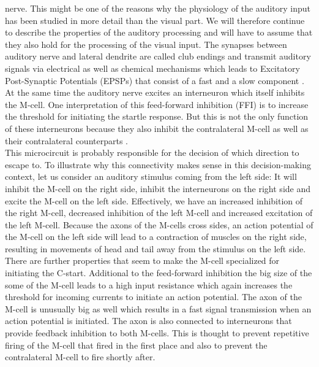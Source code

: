 \documentclass[a4paper,10pt,hidelinks]{scrreprt}
\begin{document}
	nerve.
	This might be one of the reasons why the physiology of the auditory input has been studied in 
	more detail than the visual part.
	We will therefore continue to describe the properties of the auditory processing and will have 
	to assume that they also hold for the processing of the visual input.
	The synapses between auditory nerve and lateral dendrite are called club endings and transmit 
	auditory signals via electrical as well as chemical mechanisms which leads to Excitatory 
	Post-Synaptic Potentials (EPSPs) that consist of a fast and a slow component \citep{Korn2005}.
	At the same time the auditory nerve excites an interneuron which itself inhibits the M-cell.
	One interpretation of this feed-forward inhibition (FFI) is to increase the threshold for 
	initiating the startle response.
	But this is not the only function of these interneurons because they also inhibit the 
	contralateral M-cell as well as their contralateral counterparts \citep{Koyama2016}.\\
	This microcircuit is probably responsible for the decision of which direction to escape to.
	To illustrate why this connectivity makes sense in this decision-making context, let us 
	consider an auditory stimulus coming from the left side:
	It will inhibit the M-cell on the right side, inhibit the interneurons on the right side and 
	excite the M-cell on the left side.
	Effectively, we have an increased inhibition of the right M-cell, decreased inhibition of the 
	left M-cell and increased excitation of the left M-cell.
	Because the axons of the M-cells cross sides, an action potential of the M-cell on the left 
	side will lead to a contraction of muscles on the right side, resulting in movements of head 
	and tail away from the stimulus on the left side.\\
	There are further properties that seem to make the M-cell specialized for initiating the 
	C-start.
	Additional to the feed-forward inhibition the big size of the some of the M-cell leads to a 
	high input resistance which again increases the threshold for incoming currents to initiate an 
	action potential.
	The axon of the M-cell is unusually big as well which results in a fast signal transmission 
	when an action potential is initiated.
	The axon is also connected to interneurons that provide feedback inhibition to both M-cells.
	This is thought to prevent repetitive firing of the M-cell that fired in the first place and 
	also to prevent the contralateral M-cell to fire shortly after.
\end{document}
